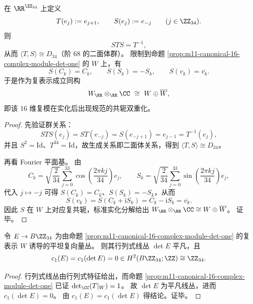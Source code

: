\begin{theorem}[\texorpdfstring{$m=11$}{m=11} 平移的二面体提升与 Dirac 型双重化]\label{thm:m11-dihedral-lift-dirac-doubling}
在 \(\RR^{\ZZ_{34}}\) 上定义
\[
T(e_j):=e_{j+1},\qquad S(e_j):=e_{-j}\qquad (j\in\ZZ_{34}).
\]
则
\[
STS=T^{-1},
\]
从而 \(\langle T,S\rangle\cong D_{34}\)（阶 \(68\) 的二面体群）。
限制到命题 \ref{prop:m11-canonical-16-complex-module-det-one} 的 \(W\) 上，有
\[
S(C_k)=C_k,\qquad S(S_k)=-S_k,\qquad S(v_k)=\overline{v_k}.
\]
于是作为复表示成立同构
\[
W_{\RR}\otimes_{\RR}\CC\ \cong\ W\oplus \overline{W},
\]
即该 \(16\) 维复模在实化后出现规范的共轭双重化。
\end{theorem}
\begin{proof}
先验证群关系：
\[
STS(e_j)=ST(e_{-j})=S(e_{-j+1})=e_{j-1}=T^{-1}(e_j),
\]
并且 \(S^2=\mathrm{Id}\)、\(T^{34}=\mathrm{Id}\)，故生成关系即二面体关系，得到 \(\langle T,S\rangle\cong D_{34}\)。
\par
再看 Fourier 平面基。
由
\[
C_k=\sqrt{\frac{2}{34}}\sum_{j=0}^{33}\cos\!\left(\frac{2\pi kj}{34}\right)e_j,\qquad
S_k=\sqrt{\frac{2}{34}}\sum_{j=0}^{33}\sin\!\left(\frac{2\pi kj}{34}\right)e_j,
\]
代入 \(j\mapsto -j\) 可得 \(S(C_k)=C_k\)、\(S(S_k)=-S_k\)，从而
\[
S(v_k)=S(C_k+\mathrm{i}S_k)=C_k-\mathrm{i}S_k=\overline{v_k}.
\]
因此 \(S\) 在 \(W\) 上对应复共轭，标准实化分解给出
\(
W_{\RR}\otimes_{\RR}\CC\cong W\oplus\overline{W}
\)。
证毕。
\end{proof}

\begin{corollary}[行列式线丛平凡性与一阶离散异常消失]\label{cor:m11-det-line-trivial-c1-zero}
令 \(E\to B\ZZ_{34}\) 为由命题 \ref{prop:m11-canonical-16-complex-module-det-one} 的复表示 \(W\) 诱导的平坦复向量丛。
则其行列式线丛 \(\det E\) 平凡，且
\[
c_1(E)=c_1(\det E)=0\in H^2(B\ZZ_{34};\ZZ)\cong \ZZ_{34}.
\]
\end{corollary}
\begin{proof}
行列式线丛由行列式特征给出，而命题 \ref{prop:m11-canonical-16-complex-module-det-one} 已证
\(
\det_{\CC}(T|_W)=1
\)。
故 \(\det E\) 为平凡线丛，进而 \(c_1(\det E)=0\)。
由 \(c_1(E)=c_1(\det E)\) 得结论。证毕。
\end{proof}

